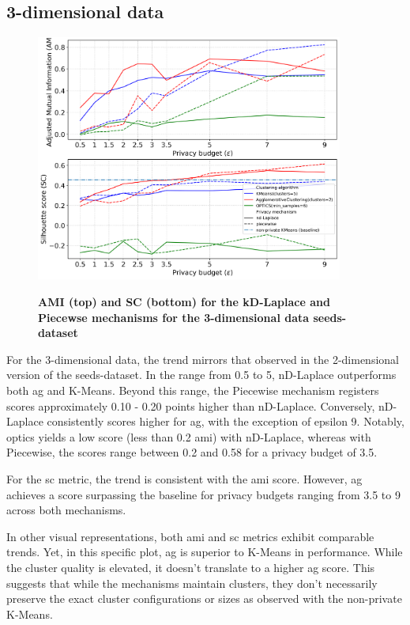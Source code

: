 \subsection{3-dimensional data}
\begin{figure}[H]
  \centering
  \caption{\textbf{AMI (top) and SC (bottom) for the kD-Laplace and Piecewse mechanisms for the 3-dimensional data seeds-dataset}}
  \includegraphics[width=0.9\textwidth]{Results/nd-laplace/nd-Laplace/seeds-dataset/ami-and-sc_3_dimensions.png}
  \label{fig:validation-seeds-dataset_comparison_3d-laplace}
\end{figure}
For the 3-dimensional data, the trend mirrors that observed in the 2-dimensional version of the seeds-dataset. In the range from 0.5 to 5, nD-Laplace outperforms both \gls{ag} and K-Means. Beyond this range, the Piecewise mechanism registers scores approximately 0.10 - 0.20 points higher than nD-Laplace. Conversely, nD-Laplace consistently scores higher for \gls{ag}, with the exception of epsilon 9. Notably, \gls{optics} yields a low score (less than 0.2 \gls{ami}) with nD-Laplace, whereas with Piecewise, the scores range between 0.2 and 0.58 for a privacy budget of 3.5.

For the \gls{sc} metric, the trend is consistent with the \gls{ami} score. However, \gls{ag} achieves a score surpassing the baseline for privacy budgets ranging from 3.5 to 9 across both mechanisms.

In other visual representations, both \gls{ami} and \gls{sc} metrics exhibit comparable trends. Yet, in this specific plot, \gls{ag} is superior to K-Means in performance. While the cluster quality is elevated, it doesn't translate to a higher \gls{ag} score. This suggests that while the mechanisms maintain clusters, they don't necessarily preserve the exact cluster configurations or sizes as observed with the non-private K-Means.

